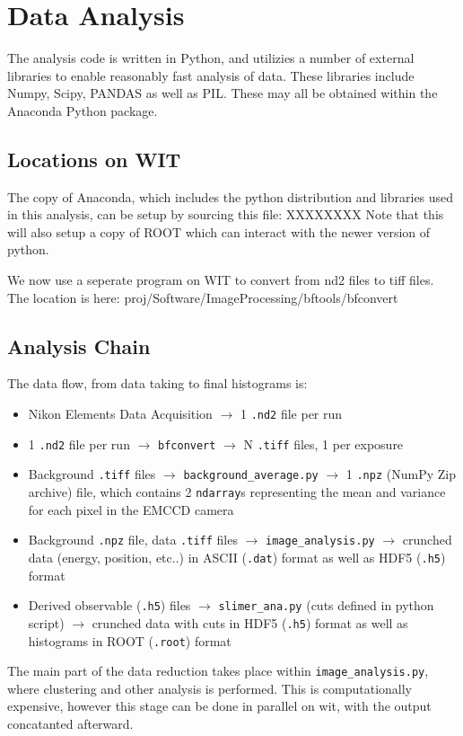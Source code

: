 \documentclass[11pt]{amsart}
\begin{document}
\section{Data Analysis}
The analysis code is written in Python, and utilizies a number of external libraries to enable reasonably fast analysis of data. These libraries include Numpy, Scipy, PANDAS as well as PIL. 
These may all be obtained within the Anaconda Python package. 
\subsection{Locations on WIT}
The copy of Anaconda, which includes the python distribution and libraries used in this analysis, can be setup by sourcing this file:
XXXXXXXX
Note that this will also setup a copy of ROOT which can interact with the newer version of python. 

We now use a seperate program on WIT to convert from nd2 files to tiff files. The location is here:
proj/Software/ImageProcessing/bftools/bfconvert


\subsection{Analysis Chain}
The data flow, from data taking to final histograms is:
\begin{itemize}
	\item Nikon Elements Data Acquisition $\rightarrow$ 1 \verb+.nd2+ file per run
	\item 1 \verb+.nd2+ file per run $\rightarrow$ \verb+bfconvert+ $\rightarrow$ N \verb+.tiff+ files, 1 per exposure
	\item  Background \verb+.tiff+ files $\rightarrow$ \verb+background_average.py+ $\rightarrow$ 1  \verb+.npz+ (NumPy Zip archive) file, which contains 2 \verb+ndarray+s representing the mean and variance for each pixel in the EMCCD camera
	\item Background  \verb+.npz+ file, data \verb+.tiff+ files  $\rightarrow$ \verb+image_analysis.py+ $\rightarrow$ crunched data  (energy, position, etc..) in ASCII (\verb+.dat+) format as well as HDF5 (\verb+.h5+) format
	\item Derived observable (\verb+.h5+) files  $\rightarrow$ \verb+slimer_ana.py+ (cuts defined in python script) $\rightarrow$ crunched data with cuts in HDF5 (\verb+.h5+) format as well as histograms in ROOT (\verb+.root+) format
	\end{itemize}
The main part of the data reduction takes place within \verb+image_analysis.py+, where clustering and other analysis is performed. This is computationally expensive, however this stage can be done in parallel on wit, with the output concatanted afterward. 
\end{document}
